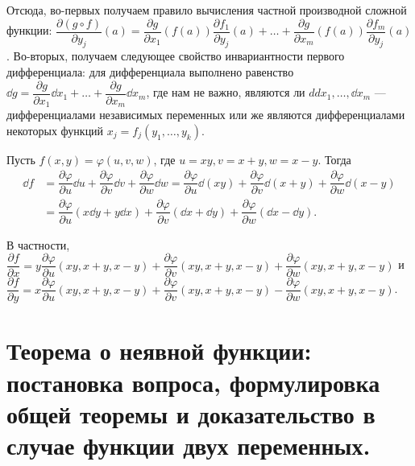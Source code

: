 \documentclass[a4paper]{article}
\theoremstyle{named}
\begin{document}
\begin{remark*}
        Отсюда, во-первых получаем правило вычисления частной производной сложной функции:
        $\dfrac{\partial (g\circ f)}{\partial y_j}(a) =
        \dfrac{\partial g}{\partial x_1}(f(a)) \dfrac{\partial f_1}{\partial y_j}(a)+\ldots+
        \dfrac{\partial g}{\partial x_m}(f(a)) \dfrac{\partial f_m}{\partial y_j}(a)$.
        Во-вторых, получаем следующее свойство инвариантности первого дифференциала:
        для дифференциала выполнено равенство
        $\dd g = \dfrac{\partial g}{\partial x_1}\dd x_1+\ldots+\dfrac{\partial g}{\partial x_m}\dd x_m$,
        где нам не важно, являются ли $
        dd x_1,\ldots, \dd x_m$ --- дифференциалами независимых переменных
        или же являются дифференциалами некоторых функций $x_j = f_j(y_1,\ldots, y_k)$.
    \end{remark*}

    \begin{example*}
        Пусть $f(x,y) = \varphi(u, v, w)$, где $u=xy, v= x+y, w=x-y$.
        Тогда
        \begin{align*}
            \dd f 
            &= \dfrac{\partial \varphi}{\partial u} \dd u + \dfrac{\partial \varphi}{\partial v} \dd v + \dfrac{\partial \varphi}{\partial w} \dd w 
            = \dfrac{\partial \varphi}{\partial u} \dd(xy) + \dfrac{\partial \varphi}{\partial v} \dd(x+y) + \dfrac{\partial \varphi}{\partial w} \dd(x-y) \\
            &= \dfrac{\partial \varphi}{\partial u} (x\dd y + y\dd x) +
            \dfrac{\partial \varphi}{\partial v} (\dd x+\dd y) + \dfrac{\partial \varphi}{\partial w} (\dd x - \dd y).
        \end{align*}

        В частности,
        $\dfrac{\partial f}{\partial x} = y\dfrac{\partial \varphi}{\partial u}(xy, x+y, x-y) +
        \dfrac{\partial \varphi}{\partial v}(xy, x+y, x-y) +  \dfrac{\partial \varphi}{\partial w}(xy, x+y, x-y)$
        и $\dfrac{\partial f}{\partial y} = x\dfrac{\partial \varphi}{\partial u}(xy, x+y, x-y) +
        \dfrac{\partial \varphi}{\partial v}(xy, x+y, x-y) -  \dfrac{\partial \varphi}{\partial w}(xy, x+y, x-y)$.
    \end{example*}

    \section{Теорема о неявной функции: постановка вопроса, формулировка общей теоремы и доказательство в случае функции двух переменных.}
\end{document}
